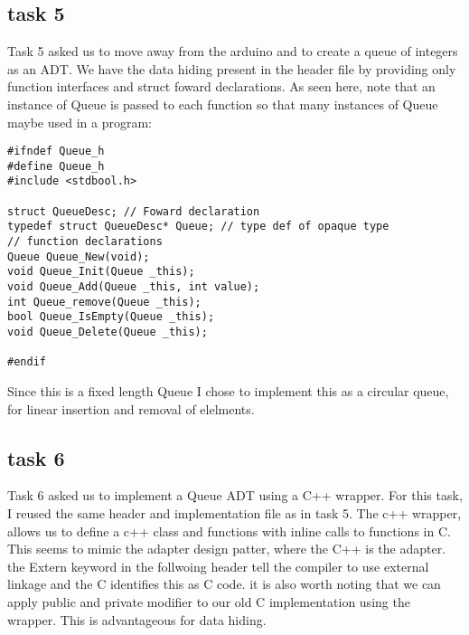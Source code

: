 \subsection{task 5}

Task 5 asked us to move away from the arduino and to create a queue of integers as an ADT. We have the data hiding present in the header file by providing only function interfaces and struct foward declarations. As seen here, note that an instance of Queue is passed to each function so that many instances of Queue maybe used in a program:\\
\begin{lstlisting}
#ifndef Queue_h
#define Queue_h
#include <stdbool.h>

struct QueueDesc; // Foward declaration
typedef struct QueueDesc* Queue; // type def of opaque type
// function declarations
Queue Queue_New(void);
void Queue_Init(Queue _this);
void Queue_Add(Queue _this, int value);
int Queue_remove(Queue _this);
bool Queue_IsEmpty(Queue _this);
void Queue_Delete(Queue _this);

#endif
\end{lstlisting}

Since this is a fixed length Queue I chose to implement this as a circular queue, for linear insertion and removal of elelments.\\

\subsection{task 6}

Task 6 asked us to implement a Queue ADT using a C++ wrapper. For this task, I reused the same header and implementation file as in task 5. The c++ wrapper, allows us to define a c++ class and functions with inline calls to functions in C. This seems to mimic the adapter design patter, where the C++ is the adapter. the Extern keyword in the follwoing header tell the compiler to use external linkage and the C identifies this as C code. 
it is also worth noting that we can apply public and private modifier to our old C implementation using the wrapper. This is advantageous for data hiding.

